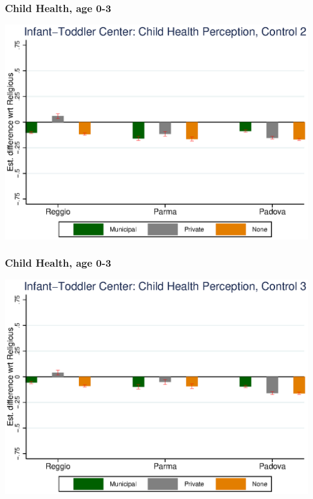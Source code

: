 \documentclass{beamer}
\begin{document}
\begin{frame}\frametitle{Child Health, age 0-3}
\center
\includegraphics[scale=0.7]{../Output/graphs/CH_Asilo_Child_inter.eps}
\end{frame}

\begin{frame}\frametitle{Child Health, age 0-3}
\center
\includegraphics[scale=0.7]{../Output/graphs/CH_Asilo_Child_right.eps}
\end{frame}
\end{document}
